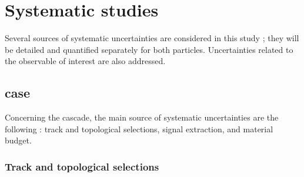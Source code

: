 \newpage
\section{Systematic studies}
\label{sec:Section05}

Several sources of systematic uncertainties are considered in this study ; they will be detailed and quantified separately for both particles. Uncertainties related to the observable of interest are also addressed.

\subsection{\rmOmega case}
\label{sec:Section05.a-}

Concerning the cascade, the main source of systematic uncertainties are the following : track and topological selections, signal extraction, and material budget.

\subsubsection{Track and topological selections}

